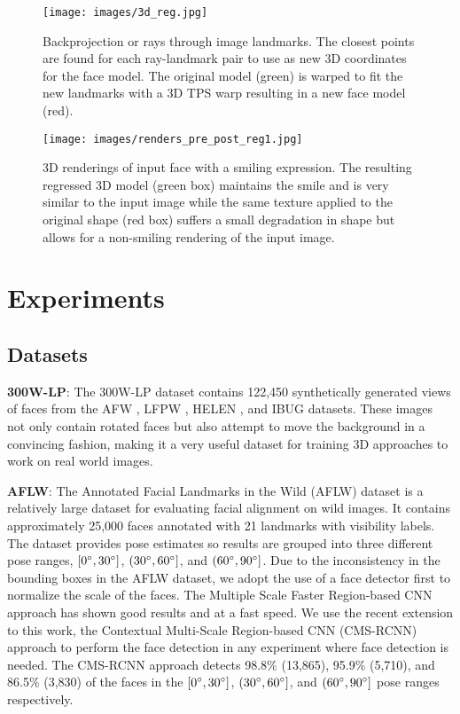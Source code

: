 \documentclass[10pt,twocolumn,letterpaper]{article}
\begin{document}
\begin{figure}[t!]
\centering
\texttt{[image: images/3d\_reg.jpg]}
\caption{Backprojection or rays through image landmarks. The closest points are found for each ray-landmark pair to use as new 3D coordinates for the face model. The original model (green) is warped to fit the new landmarks with a 3D TPS warp resulting in a new face model (red).}
\label{fig:3Dwarp}
\end{figure}

\begin{figure}[t!]
\centering
\texttt{[image: images/renders\_pre\_post\_reg1.jpg]}
\caption{3D renderings of input face with a smiling expression. The resulting regressed 3D model (green box) maintains the smile and is very similar to the input image while the same texture applied to the original shape (red box) suffers a small degradation in shape but allows for a non-smiling rendering of the input image.}
\label{fig:3Dexpr}
\end{figure}

\section{Experiments}

\subsection{Datasets}
\textbf{300W-LP}: The 300W-LP \cite{Zhu16falp} dataset contains 122,450 synthetically generated views of faces from the AFW \cite{afw}, LFPW \cite{lfpw}, HELEN \cite{helen}, and IBUG \cite{ibug} datasets. These images not only contain rotated faces but also attempt to move the background in a convincing fashion, making it a very useful dataset for training 3D approaches to work on real world images.

\textbf{AFLW}: The Annotated Facial Landmarks in the Wild (AFLW) dataset \cite{aflw} is a relatively large dataset for evaluating facial alignment on wild images. It contains approximately 25,000 faces annotated with 21 landmarks with visibility labels. The dataset provides pose estimates so results are grouped into three different pose ranges, $[0\degree, 30\degree]$, $(30\degree, 60\degree]$, and $(60\degree, 90\degree]$. Due to the inconsistency in the bounding boxes in the AFLW dataset, we adopt the use of a face detector first to normalize the scale of the faces. The Multiple Scale Faster Region-based CNN approach \cite{msfrcnn} has shown good results and at a fast speed. We use the recent extension to this work, the Contextual Multi-Scale Region-based CNN (CMS-RCNN) approach \cite{cmsrcnn} to perform the face detection in any experiment where face detection is needed. The CMS-RCNN approach detects 98.8\% (13,865), 95.9\% (5,710), and 86.5\% (3,830) of the faces in the $[0\degree, 30\degree]$, $(30\degree, 60\degree]$, and $(60\degree, 90\degree]$ pose ranges respectively.
\end{document}
